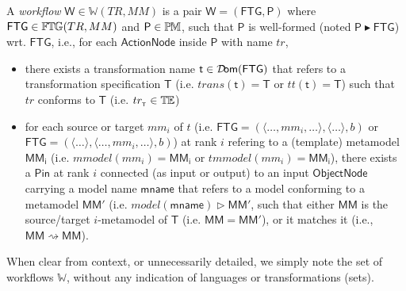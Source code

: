 \begin{Definition}
A \emph{workflow} $\mathsf{W}\in\mathbb{W}(TR, MM)$ is a pair $\mathsf{W} = 
(\mathsf{FTG}, \mathsf{P})$ where $\mathsf{FTG}\in\mathbb{F}\mskip-1mu\mathbb{T}\mskip-1mu\mathbb{G}(TR, MM)$ and 
$\mathsf{P}\in\mathbb{P}\mskip-1mu\mathbb{M}$, such that $\mathsf{P}$ is well-formed (noted 
$\mathsf{P} \blacktriangleright \mathsf{FTG}$) wrt. $\mathsf{FTG}$, i.e., for 
each $\mathsf{ActionNode}$ inside $\mathsf{P}$ with name 
$tr$,
\begin{itemize}
   \item there exists a transformation name $\mathsf{t}\in \mathsf{\mathcal{D}\!om}(\mathsf{FTG})$ 
that refers to a transformation specification $\mathsf{T}$ (i.e. $trans(\mathsf{t}) = 
\mathsf{T}$ or $tt(\mathsf{t}) = \mathsf{T}$) such that $tr$ conforms to $\mathsf{T}$ 
(i.e. $tr_{_{\mathsf{T}}}\in\mathbb{T}\mskip-1mu\mathbb{E}$)

   \item for each source or target $mm_i$ of $t$ (i.e. $\mathsf{FTG} = (\langle \ldots, mm_i, \ldots \rangle, \langle \ldots\rangle, b)$ or $\mathsf{FTG} = ( \langle \ldots\rangle, \langle \ldots, mm_i, \ldots \rangle, b)$) at rank $i$ refering to a (template) metamodel $\mathsf{MM_i}$ (i.e. $mmodel(mm_i) = \mathsf{MM_i}$ or $tmmodel(mm_i) = \mathsf{MM_i}$), there exists a $\mathsf{Pin}$ at rank $i$ connected (as input or output) to an input $\mathsf{ObjectNode}$ carrying a model name $\mathsf{mname}$ that refers to a model conforming to a metamodel $\mathsf{MM'}$ (i.e. $model(\mathsf{mname}) \rhd \mathsf{MM'}$, such that either $\mathsf{MM}$ is the source/target $i$-metamodel of $\mathsf{T}$ (i.e. $\mathsf{MM} = \mathsf{MM'}$), or it matches it (i.e., $\mathsf{MM} \rightsquigarrow \mathsf{MM}$).

%       
\end{itemize}
\end{Definition}
\noindent
When clear from context, or unnecessarily detailed, we simply note the set of 
workflows $\mathbb{W}$, without any indication of languages or 
transformations (sets).

